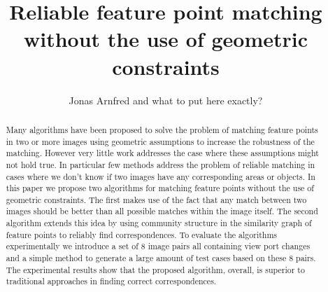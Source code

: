\documentclass[12pt,journal,compsoc]{IEEEtran}
\begin{document}
\title{Reliable feature point matching without the use of geometric 
constraints}
\author{Jonas Arnfred and what to put here exactly?}

\maketitle
%
\begin{abstract}
Many algorithms have been proposed to solve the problem of matching 
feature points in two or more images using geometric assumptions to 
increase the robustness of the matching. However very little work 
addresses the case where these assumptions might not hold true. In 
particular few methods address the problem of reliable matching in cases 
where we don't know if two images have any corresponding areas or 
objects. In this paper we propose two algorithms for matching feature 
points without the use of geometric constraints. The first makes use of 
the fact that any match between two images should be better than all 
possible matches within the image itself. The second algorithm extends 
this idea by using community structure in the similarity graph of 
feature points to reliably find correspondences. To evaluate the 
algorithms experimentally we introduce a set of 8 image pairs all 
containing view port changes and a simple method to generate a large 
amount of test cases based on these 8 pairs. The experimental results 
show that the proposed algorithm, overall, is superior to traditional 
approaches in finding correct correspondences.
\end{abstract}
%
\end{document}
